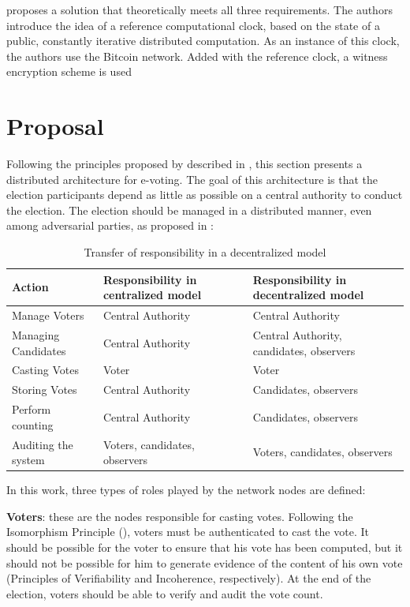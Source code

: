 \documentclass[english]{textolivre}
\begin{document}
\textcite{Liu} proposes a solution that theoretically meets all three requirements. The authors introduce the idea of a reference computational clock, based on the state of a public, constantly iterative distributed computation. As an instance of this clock, the authors use the Bitcoin network. Added with the reference clock, a witness encryption scheme is used \cite{garg2013witness}


\section{Proposal \label{sec-Proposal}}

Following the principles proposed by \textcite{Gritzalis} described in , this section presents a distributed architecture for e-voting. The goal of this architecture is that the election participants depend as little as possible on a central authority to conduct the election. The election should be managed in a distributed manner, even among adversarial parties, as proposed in :

\begin{table}[htpb]
\centering
\small
\begin{threeparttable}
  \caption{Transfer of responsibility in a decentralized model}
  \label{proposal}
  \begin{tabular}{lll}
  \toprule
   Action & Responsibility in centralized model & Responsibility in decentralized model \\
  \midrule 
   Manage Voters & Central Authority & Central Authority \\
   Managing Candidates & Central Authority & Central Authority, candidates, observers \\
   Casting Votes & Voter & Voter \\
   Storing Votes & Central Authority & Candidates, observers \\
   Perform counting & Central Authority & Candidates, observers \\
   Auditing the system & Voters, candidates, observers & Voters, candidates, observers \\
  \bottomrule
\end{tabular}%
\end{threeparttable}
\end{table}

In this work, three types of roles played by the network nodes are defined:

\textbf{Voters}: these are the nodes responsible for casting votes. Following the Isomorphism Principle (), voters must be authenticated to cast the vote. It should be possible for the voter to ensure that his vote has been computed, but it should not be possible for him to generate evidence of the content of his own vote (Principles of Verifiability and Incoherence, respectively). At the end of the election, voters should be able to verify and audit the vote count.
\end{document}
